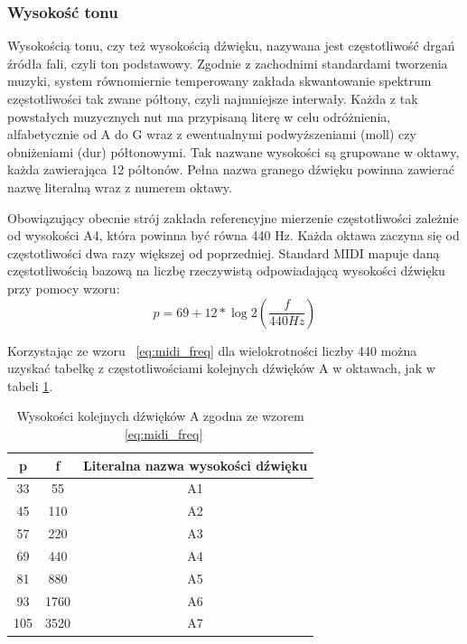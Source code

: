\documentclass[12pt,a4paper,twoside]{mwart}
\begin{document}
\subsubsection{Wysokość tonu}
Wysokością tonu, czy też wysokością dźwięku, nazywana jest częstotliwość drgań źródła fali, czyli ton podstawowy. Zgodnie z zachodnimi standardami tworzenia muzyki, system równomiernie temperowany zakłada skwantowanie spektrum częstotliwości tak zwane półtony, czyli najmniejsze interwały. Każda z tak powstałych muzycznych nut ma przypisaną literę w celu odróżnienia, alfabetycznie od A do G wraz z ewentualnymi podwyższeniami (moll) czy obniżeniami (dur) półtonowymi. Tak nazwane wysokości są grupowane w oktawy, każda zawierająca 12 półtonów. Pełna nazwa granego dźwięku powinna zawierać nazwę literalną wraz z numerem oktawy.

Obowiązujący obecnie strój zakłada referencyjne mierzenie częstotliwości zależnie od wysokości A4, która powinna być równa 440 Hz. Każda oktawa zaczyna się od częstotliwości dwa razy większej od poprzedniej. Standard MIDI\cite[67-71]{Homerecording:LevelUp} mapuje daną częstotliwością bazową na liczbę rzeczywistą odpowiadającą wysokości dźwięku przy pomocy wzoru:
\begin{equation} \label{eq:midi_freq}
p = 69 + 12 * \log{2}(\frac{f}{440 Hz})
\end{equation}

Korzystając ze wzoru ~\ref{eq:midi_freq} dla wielokrotności liczby 440 można uzyskać tabelkę z częstotliwościami kolejnych dźwięków A w oktawach, jak w tabeli \ref{tab:FqMidi}.

\begin{table}[H]
  \begin{center}
    \begin{tabular}{ |c|c|c| } 
    \hline
    p & f & Literalna nazwa wysokości dźwięku\\
    \hline
    33 & 55 & A1\\
    45 & 110 & A2\\
    57 & 220 & A3\\
    69 & 440 & A4\\
    81 & 880 & A5\\
    93 & 1760 & A6\\
    105 & 3520 & A7\\
    \hline
    \end{tabular}
  \end{center}
  \caption{Wysokości kolejnych dźwięków A zgodna ze wzorem ~\ref{eq:midi_freq}}
  \label{tab:FqMidi}
\end{table}
\end{document}
